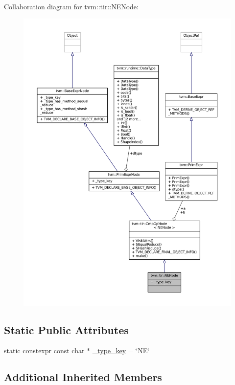 Collaboration diagram for tvm\+:\+:tir\+:\+:N\+E\+Node\+:
\nopagebreak
\begin{figure}[H]
\begin{center}
\leavevmode
\includegraphics[width=350pt]{classtvm_1_1tir_1_1NENode__coll__graph}
\end{center}
\end{figure}
\subsection*{Static Public Attributes}
\begin{DoxyCompactItemize}
\item 
static constexpr const char $\ast$ \hyperlink{classtvm_1_1tir_1_1NENode_af1bdf02f37f264a3bd77ea8ea0eb540d}{\+\_\+type\+\_\+key} = \char`\"{}NE\char`\"{}
\end{DoxyCompactItemize}
\subsection*{Additional Inherited Members}


